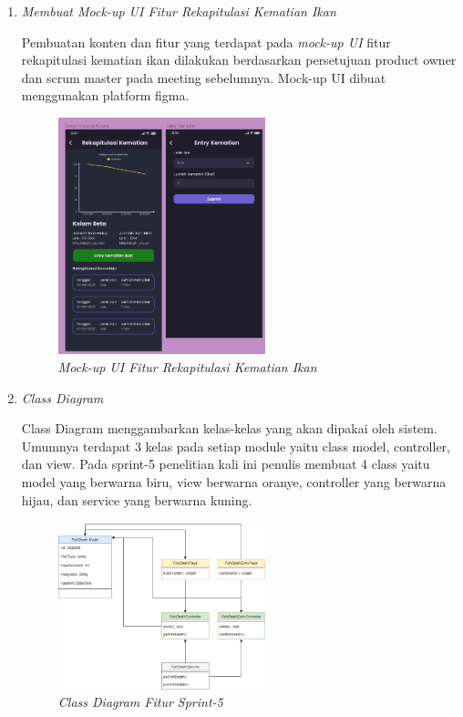 \begin{enumerate}[listparindent=2em]
	
	\item{\textit{Membuat Mock-up UI Fitur Rekapitulasi Kematian Ikan}}
	
	Pembuatan konten dan fitur yang terdapat pada \textit{mock-up UI} fitur rekapitulasi kematian ikan dilakukan berdasarkan persetujuan product owner dan scrum master pada meeting sebelumnya. Mock-up UI dibuat menggunakan platform figma.
	
	\begin{figure}[H]
	\centering
	\includegraphics[keepaspectratio, width=6cm]{gambar/mockupkematian}
	\caption{\textit{Mock-up UI Fitur Rekapitulasi Kematian Ikan}}
	\label{gambar:mockupkematian}
	\end{figure}

	\item{\textit{Class Diagram}}
	
	Class Diagram menggambarkan kelas-kelas yang akan dipakai oleh sistem. Umumnya terdapat 3 kelas pada setiap module yaitu class model, controller, dan view. Pada sprint-5 penelitian kali ini penulis membuat 4 class yaitu model yang berwarna biru, view berwarna oranye, controller yang berwarna hijau, dan service yang berwarna kuning.
	 
	 \begin{figure}[H]
	 \centering
	 \includegraphics[keepaspectratio, width=6cm]{gambar/deathcd}
	 \caption{\textit{Class Diagram Fitur Sprint-5}}
	 \label{gambar:deathcd}
	 \end{figure}


\end{enumerate}
